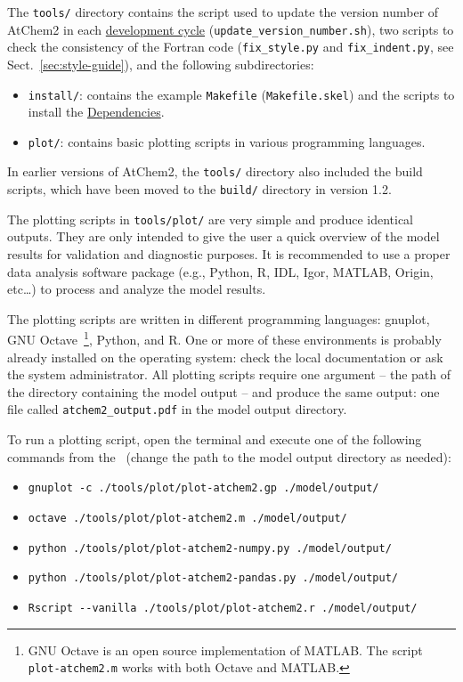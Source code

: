 The \texttt{tools/} directory contains the script used to update the
version number of AtChem2 in each
\hyperref[ch:development]{development cycle}
(\texttt{update\_version\_number.sh}), two scripts to check the
consistency of the Fortran code (\texttt{fix\_style.py} and
\texttt{fix\_indent.py}, see Sect.~\ref{sec:style-guide}), and the
following subdirectories:

\begin{itemize}
\item \texttt{install/}: contains the example \texttt{Makefile}
  (\texttt{Makefile.skel}) and the scripts to install the
  \hyperref[sec:dependencies]{Dependencies}.
\item \texttt{plot/}: contains basic plotting scripts in various
  programming languages.
\end{itemize}

In earlier versions of AtChem2, the \texttt{tools/} directory also
included the build scripts, which have been moved to the
\texttt{build/} directory in version 1.2.

The plotting scripts in \texttt{tools/plot/} are very simple and
produce identical outputs. They are only intended to give the user a
quick overview of the model results for validation and diagnostic
purposes. It is recommended to use a proper data analysis software
package (e.g., Python, R, IDL, Igor, MATLAB, Origin, etc\ldots) to
process and analyze the model results.

The plotting scripts are written in different programming languages:
gnuplot, GNU Octave~\footnote{GNU Octave is an open source
  implementation of MATLAB. The script \texttt{plot-atchem2.m} works
  with both Octave and MATLAB.}, Python, and R. One or more of these
environments is probably already installed on the operating system:
check the local documentation or ask the system administrator. All
plotting scripts require one argument -- the path of the directory
containing the model output -- and produce the same output: one file
called \texttt{atchem2\_output.pdf} in the model output directory.

To run a plotting script, open the terminal and execute one of the
following commands from the \maindir\ (change the path to the model
output directory as needed):

\begin{itemize}
\item \verb|gnuplot -c ./tools/plot/plot-atchem2.gp ./model/output/|
\item \verb|octave ./tools/plot/plot-atchem2.m ./model/output/|
\item \verb|python ./tools/plot/plot-atchem2-numpy.py ./model/output/|
\item \verb|python ./tools/plot/plot-atchem2-pandas.py ./model/output/|
\item \verb|Rscript --vanilla ./tools/plot/plot-atchem2.r ./model/output/|
\end{itemize}


